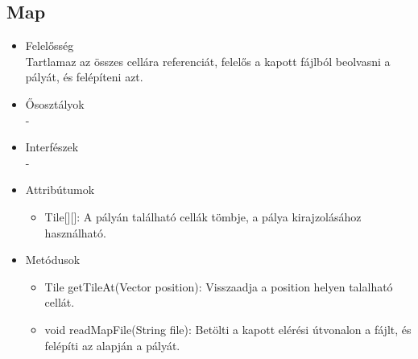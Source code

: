 \subsection{Map}
\begin{itemize}
\item Felelősség\\
Tartlamaz az összes cellára referenciát, felelős a kapott fájlból beolvasni a pályát, és felépíteni azt.
\item Ősosztályok\\
-
\item Interfészek\\
-
\item Attribútumok\\
	\begin{itemize}
		\item Tile[][]: A pályán található cellák tömbje, a pálya kirajzolásához használható.
	\end{itemize}
\item Metódusok\\
	\begin{itemize}
		\item Tile getTileAt(Vector position): Visszaadja a position helyen talalható cellát.
		\item void readMapFile(String file): Betölti a kapott elérési útvonalon a fájlt, és felépíti az alapján a pályát.
	\end{itemize}
\end{itemize}


